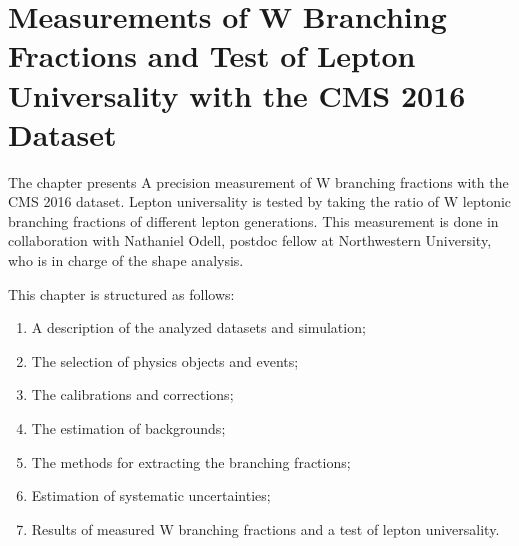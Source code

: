 \chapter{Measurements of W Branching Fractions and Test of Lepton Universality with the CMS 2016 Dataset}
\label{sec:analysis}


The chapter presents A precision measurement of W branching fractions with the CMS 2016 dataset. Lepton universality is tested by taking the ratio of W leptonic branching fractions of different lepton generations. This measurement is done in collaboration with Nathaniel Odell, postdoc fellow at Northwestern University, who is in charge of the shape analysis. 


This chapter is structured as follows:

\begin{enumerate}
    \item A description of the analyzed datasets and simulation;
    \item The selection of physics objects and events;
    \item The calibrations and corrections;
    \item The estimation of backgrounds;
    \item The methods for extracting the branching fractions;
    \item Estimation of systematic uncertainties;
    \item Results of measured W branching fractions and a test of lepton universality.
\end{enumerate}
    
    












